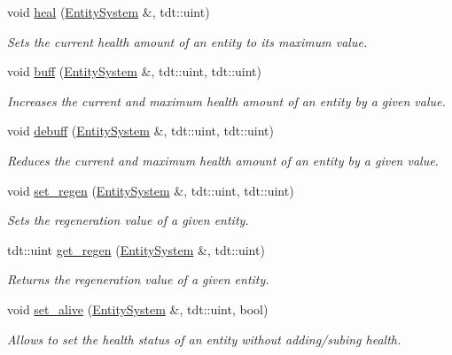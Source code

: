 \begin{DoxyCompactItemize}
void \hyperlink{namespace_health_helper_a3e693b9a5605f22f9ebfbdf9a09acb15}{heal} (\hyperlink{class_entity_system}{Entity\+System} \&, tdt\+::uint)
\begin{DoxyCompactList}\small\item\em Sets the current health amount of an entity to it\textquotesingle{}s maximum value. \end{DoxyCompactList}\item 
void \hyperlink{namespace_health_helper_aebd8983c1cc786a35fd1389862f4c556}{buff} (\hyperlink{class_entity_system}{Entity\+System} \&, tdt\+::uint, tdt\+::uint)
\begin{DoxyCompactList}\small\item\em Increases the current and maximum health amount of an entity by a given value. \end{DoxyCompactList}\item 
void \hyperlink{namespace_health_helper_afb6e9defd5d23971b24a675125fb1c18}{debuff} (\hyperlink{class_entity_system}{Entity\+System} \&, tdt\+::uint, tdt\+::uint)
\begin{DoxyCompactList}\small\item\em Reduces the current and maximum health amount of an entity by a given value. \end{DoxyCompactList}\item 
void \hyperlink{namespace_health_helper_a69c44b3a45bcf317ef97b7600e0e4730}{set\+\_\+regen} (\hyperlink{class_entity_system}{Entity\+System} \&, tdt\+::uint, tdt\+::uint)
\begin{DoxyCompactList}\small\item\em Sets the regeneration value of a given entity. \end{DoxyCompactList}\item 
tdt\+::uint \hyperlink{namespace_health_helper_a6c141b2a2fcb97d402ac0f28fbeb7a0d}{get\+\_\+regen} (\hyperlink{class_entity_system}{Entity\+System} \&, tdt\+::uint)
\begin{DoxyCompactList}\small\item\em Returns the regeneration value of a given entity. \end{DoxyCompactList}\item 
void \hyperlink{namespace_health_helper_a3f87b065077afca159efe651404890aa}{set\+\_\+alive} (\hyperlink{class_entity_system}{Entity\+System} \&, tdt\+::uint, bool)
\begin{DoxyCompactList}\small\item\em Allows to set the health status of an entity without adding/subing health. \end{DoxyCompactList}\item 

\end{DoxyCompactItemize}
